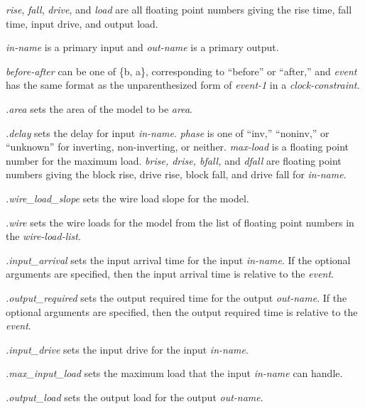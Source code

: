 {\begin{pespace}
\begin{description}
\item {\em rise}, {\em fall}, {\em drive}, and {\em load} are all floating
point numbers giving the rise time, fall time, input drive, and output load.

\item {\em in-name} is a primary input and {\em out-name} is a primary
output.

\item {\em before-after} can be one of \{b, a\}, corresponding to ``before''
or ``after,'' and {\em event} has the same format as the unparenthesized
form of {\em event-1} in a {\em clock-constraint}.

\item {\em .area} sets the area of the model to be {\em area}.

\item {\em .delay} sets the delay for input {\em in-name}.  {\em phase} is
one of ``{\sc inv},'' ``{\sc noninv},'' or ``{\sc unknown}'' for inverting,
non-inverting, or neither.  {\em max-load} is a floating point number for
the maximum load.  {\em brise, drise, bfall,} and {\em dfall} are floating
point numbers giving the block rise, drive rise, block fall, and drive fall
for {\em in-name}.

\item {\em .wire\_load\_slope} sets the wire load slope for the model.

\item {\em .wire} sets the wire loads for the model from the list of floating
point numbers in the {\em wire-load-list}.

\item {\em .input\_arrival} sets the input arrival time for the input {\em
in-name}.  If the optional arguments are specified, then the input arrival
time is relative to the {\em event}.

\item {\em .output\_required} sets the output required time for the output
{\em out-name}.  If the optional arguments are specified, then the output
required time is relative to the {\em event}.

\item {\em .input\_drive} sets the input drive for the input {\em in-name}.

\item {\em .max\_input\_load} sets the maximum load that the input {\em in-name} can handle.

\item {\em .output\_load} sets the output load for the output {\em out-name}.


\end{description}
\end{pespace}}
